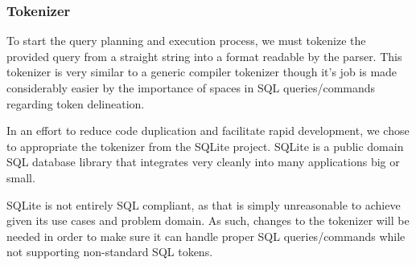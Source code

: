 \documentclass[letterpaper]{article}
\begin{document}

\subsubsection{Tokenizer}
To start the query planning and execution process, we must tokenize the provided query
from a straight string into a format readable by the parser. This tokenizer is very
similar to a generic compiler tokenizer though it's job is made considerably easier 
by the importance of spaces in SQL queries/commands regarding token delineation.
\par\vspace{\baselineskip}
In an effort to reduce code duplication and facilitate rapid development, we chose
to appropriate the tokenizer from the SQLite project. SQLite is a public domain
SQL database library that integrates very cleanly into many applications big
or small.
\par\vspace{\baselineskip}
SQLite is not entirely SQL compliant, as that is simply unreasonable to achieve
given its use cases and problem domain. As such, changes to the tokenizer will be
needed in order to make sure it can handle proper SQL queries/commands while 
not supporting non-standard SQL tokens.
\end{document}
